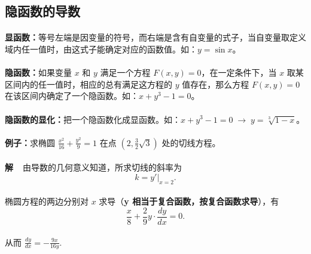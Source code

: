 \subsection{隐函数的导数}
\paragraph{}
\textbf{显函数：}等号左端是因变量的符号，而右端是含有自变量的式子，当自变量取定义域内任一值时，由这式子能确定对应的函数值。如：$y = \sin x$。

\paragraph{}
\textbf{隐函数：}如果变量 $x$ 和 $y$ 满足一个方程 $F(x,y) = 0$，在一定条件下，当 $x$ 取某区间内的任一值时，相应的总有满足这方程的 $y$ 值存在，那么方程 $F(x,y) = 0$ 在该区间内确定了一个隐函数。如：$x + y^3 - 1 = 0$。

\paragraph{}
\textbf{隐函数的显化：}把一个隐函数化成显函数。如：$x + y^3 - 1 = 0 \; \to \; y = \sqrt[3]{1 - x}$。

\paragraph{}
\textbf{例子：}求椭圆 $\frac{x^2}{16} + \frac{y^2}{9} = 1$ 在点 $(2, \frac{3}{2}\sqrt{3})$ 处的切线方程。

\paragraph{}
\textbf{解~~}由导数的几何意义知道，所求切线的斜率为
\begin{equation*}
k = y'|_{x = 2}.
\end{equation*}
\paragraph{}
椭圆方程的两边分别对 $x$ 求导（\textbf{y 相当于复合函数，按复合函数求导}），有
\begin{equation*}
\frac{x}{8} + \frac{2}{9}y \cdot \frac{dy}{dx} = 0.
\end{equation*}
\paragraph{}
从而 $\frac{dy}{dx} = -\frac{9x}{16y}.$

